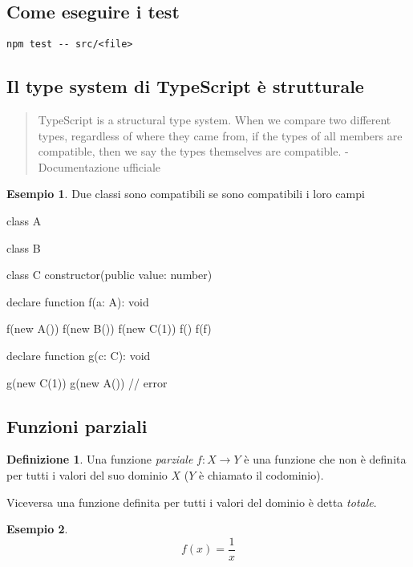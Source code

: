 \documentclass[12pt]{article}
\theoremstyle{definition}
\newtheorem{definition}{Definizione}[section]
\newtheorem{example}{Esempio}[subsection]
\newenvironment{code}
  {\vspace{0.5cm} \VerbatimEnvironment\begin{typescriptcode}}
  {\end{typescriptcode} \vspace{0.2cm}}
\begin{document}
\subsection{Come eseguire i test}

\begin{verbatim}
npm test -- src/<file>
\end{verbatim}

\subsection{Il type system di TypeScript è strutturale}

\begin{quote}
TypeScript is a structural type system. When we compare two different types, regardless of where they came from,
if the types of all members are compatible, then we say the types themselves are compatible. - Documentazione ufficiale
\end{quote}

\begin{example}
Due classi sono compatibili se sono compatibili i loro campi

\begin{code}
class A {}

class B {}

class C {
  constructor(public value: number) {}
}

declare function f(a: A): void

f(new A())
f(new B())
f(new C(1))
f({})
f(f)

declare function g(c: C): void

g(new C(1))
g(new A()) // error
\end{code}
\end{example}

\subsection{Funzioni parziali}

\begin{definition}
Una funzione \emph{parziale} $f: X \rightarrow Y$ è una funzione che non è definita per tutti i valori del suo dominio $X$
($Y$ è chiamato il codominio).
\end{definition}

Viceversa una funzione definita per tutti i valori del dominio è detta \emph{totale}.

\begin{example}
$$
f(x) = \frac{1}{x}
$$
\end{example}
\end{document}
